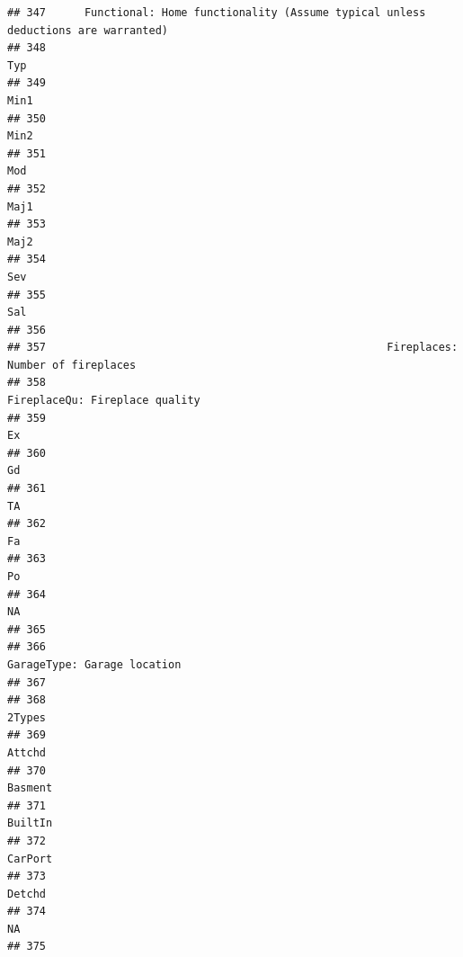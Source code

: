 \documentclass[
]{article}
\begin{document}
\begin{verbatim}
## 347      Functional: Home functionality (Assume typical unless deductions are warranted)
## 348                                                                                  Typ
## 349                                                                                 Min1
## 350                                                                                 Min2
## 351                                                                                  Mod
## 352                                                                                 Maj1
## 353                                                                                 Maj2
## 354                                                                                  Sev
## 355                                                                                  Sal
## 356                                                                                     
## 357                                                     Fireplaces: Number of fireplaces
## 358                                                       FireplaceQu: Fireplace quality
## 359                                                                                   Ex
## 360                                                                                   Gd
## 361                                                                                   TA
## 362                                                                                   Fa
## 363                                                                                   Po
## 364                                                                                   NA
## 365                                                                                     
## 366                                                          GarageType: Garage location
## 367                                                                                     
## 368                                                                               2Types
## 369                                                                               Attchd
## 370                                                                              Basment
## 371                                                                              BuiltIn
## 372                                                                              CarPort
## 373                                                                               Detchd
## 374                                                                                   NA
## 375                                                                                     

\end{verbatim}
\end{document}
